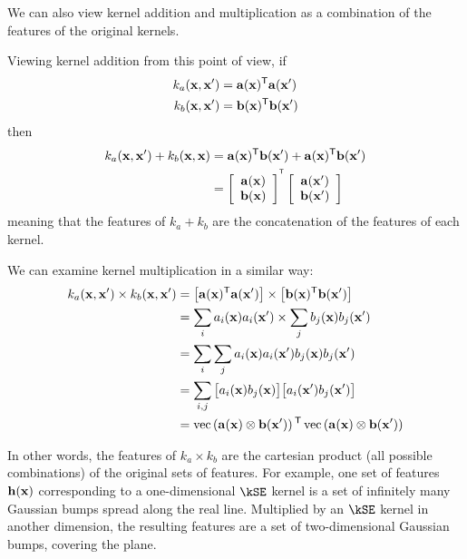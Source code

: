\def\feata{\va}
\def\featb{\vb}

We can also view kernel addition and multiplication as a combination of the features of the original kernels.

Viewing kernel addition from this point of view, if
%
\begin{align}
k_a(\iva, \iva') & = \feata(\iva)\tra \feata(\iva')\\
k_b(\iva, \iva') & = \featb(\iva)\tra \featb(\iva')
\end{align}
%
then
%
\begin{align}
k_a(\iva, \iva') + k_b(\iva, \iva)
& = \feata(\iva)\tra \featb(\iva') + \feata(\iva)\tra \featb(\iva') \\
& = \colvec{\feata(\iva)}{\featb(\iva)}^\tra \colvec{\feata(\iva')}{\featb(\iva')}
\end{align}
%
meaning that the features of $k_a + k_b$ are the concatenation of the features of each kernel.

We can examine kernel multiplication in a similar way:
%
\begin{align}
k_a(\iva, \iva') \times k_b(\iva, \iva')
& = \left[ \feata(\iva)\tra \feata(\iva') \right] \times \left[ \featb(\iva)\tra \featb(\iva') \right] \\
& = \sum_i a_i(\iva) a_i(\iva') \times \sum_j b_j(\iva) b_j(\iva') \\
& = \sum_i \sum_j a_i(\iva) a_i(\iva') b_j(\iva) b_j(\iva') \\
& = \sum_{i,j} \big[ a_i(\iva) b_j(\iva) \big] \big[ a_i(\iva') b_j(\iva') \big] \\
& = \vecop{ \feata(\iva) \otimes \featb(\iva') } \tra \vecop{ \feata(\iva) \otimes \featb(\iva')} 
\end{align}

In other words, the features of $k_a \times k_b$ are the cartesian product (all possible combinations) of the original sets of features.
For example, one set of features ${\bf{h}}({\bf{x}})$ corresponding to a one-dimensional $\kSE$ kernel is a set of infinitely many Gaussian bumps spread along the real line.
Multiplied by an $\kSE$ kernel in another dimension, the resulting features are a set of two-dimensional Gaussian bumps, covering the plane.






